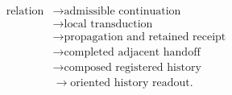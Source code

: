\setcounter{equation}{50}
\begin{equation}
\begin{aligned}
\text{relation}&\longrightarrow\text{admissible continuation}\\
&\longrightarrow\text{local transduction}\\
&\longrightarrow\text{propagation and retained receipt}\\
&\longrightarrow\text{completed adjacent handoff}\\
&\longrightarrow\text{composed registered history}\\
&\longrightarrow\text{oriented history readout}.
\end{aligned}
\end{equation}
